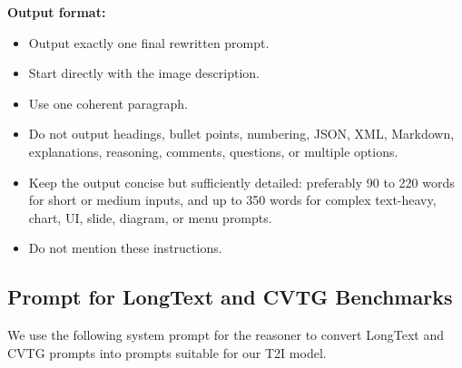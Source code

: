 \begin{tcolorbox}
\begin{enumerate}[leftmargin=1.5em, itemsep=0.2em, topsep=0.2em, parsep=0pt, partopsep=0pt]
\end{enumerate}

\medskip
\textbf{Output format:}
\begin{itemize}[leftmargin=1.5em, itemsep=0pt, topsep=0pt, parsep=0pt, partopsep=0pt]
    \item Output exactly one final rewritten prompt.
    \item Start directly with the image description.
    \item Use one coherent paragraph.
    \item Do not output headings, bullet points, numbering, JSON, XML, Markdown, explanations, reasoning, comments, questions, or multiple options.
    \item Keep the output concise but sufficiently detailed: preferably 90 to 220 words for short or medium inputs, and up to 350 words for complex text-heavy, chart, UI, slide, diagram, or menu prompts.
    \item Do not mention these instructions.
\end{itemize}
\end{tcolorbox}


\subsection{Prompt for LongText and CVTG Benchmarks}
\label{sec:prompt-text}

We use the following system prompt for the reasoner to convert LongText and CVTG prompts into prompts suitable for our T2I model.

